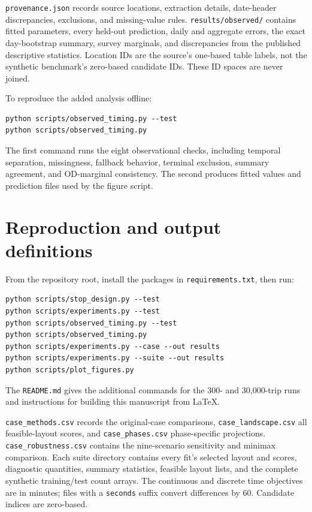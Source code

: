 \documentclass[11pt]{article}
\theoremstyle{remark}\newtheorem{remark}[theorem]{Remark}
\begin{document}
\texttt{provenance.json} records source locations, extraction details, date-header discrepancies, exclusions, and missing-value rules. \texttt{results/observed/} contains fitted parameters, every held-out prediction, daily and aggregate errors, the exact day-bootstrap summary, survey marginals, and discrepancies from the published descriptive statistics. Location IDs are the source's one-based table labels, not the synthetic benchmark's zero-based candidate IDs. These ID spaces are never joined.

To reproduce the added analysis offline:
\begin{verbatim}
python scripts/observed_timing.py --test
python scripts/observed_timing.py
\end{verbatim}
The first command runs the eight observational checks, including temporal separation, missingness, fallback behavior, terminal exclusion, summary agreement, and OD-marginal consistency. The second produces fitted values and prediction files used by the figure script.

\section{Reproduction and output definitions}\label{app:reproduce}
From the repository root, install the packages in \texttt{requirements.txt}, then run:
\begin{verbatim}
python scripts/stop_design.py --test
python scripts/experiments.py --test
python scripts/observed_timing.py --test
python scripts/observed_timing.py
python scripts/experiments.py --case --out results
python scripts/experiments.py --suite --out results
python scripts/plot_figures.py
\end{verbatim}
The \texttt{README.md} gives the additional commands for the 300- and 30,000-trip runs and instructions for building this manuscript from LaTeX.

\texttt{case\_methods.csv} records the original-case comparisons, \texttt{case\_landscape.csv} all feasible-layout scores, and \texttt{case\_phases.csv} phase-specific projections. \texttt{case\_robustness.csv} contains the nine-scenario sensitivity and minimax comparison. Each suite directory contains every fit's selected layout and scores, diagnostic quantities, summary statistics, feasible layout lists, and the complete synthetic training/test count arrays. The continuous and discrete time objectives are in minutes; files with a \texttt{seconds} suffix convert differences by 60. Candidate indices are zero-based.
\end{document}
